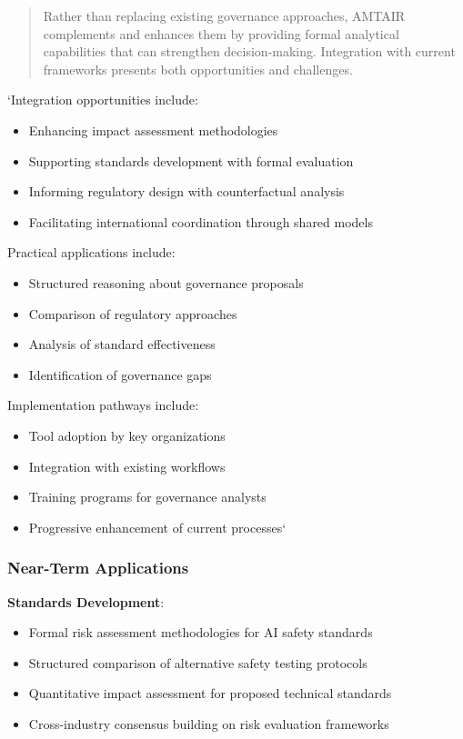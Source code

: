 \documentclass[
  11pt,
  letterpaper,
]{book}
\providecommand{\tightlist}{%
  \setlength{\itemsep}{0pt}\setlength{\parskip}{0pt}}
\begin{document}
\begin{quote}
Rather than replacing existing governance approaches, AMTAIR complements
and enhances them by providing formal analytical capabilities that can
strengthen decision-making. Integration with current frameworks presents
both opportunities and challenges.
\end{quote}

`Integration opportunities include:

\begin{itemize}
\tightlist
\item
  Enhancing impact assessment methodologies
\item
  Supporting standards development with formal evaluation
\item
  Informing regulatory design with counterfactual analysis
\item
  Facilitating international coordination through shared models
\end{itemize}

Practical applications include:

\begin{itemize}
\tightlist
\item
  Structured reasoning about governance proposals
\item
  Comparison of regulatory approaches
\item
  Analysis of standard effectiveness
\item
  Identification of governance gaps
\end{itemize}

Implementation pathways include:

\begin{itemize}
\tightlist
\item
  Tool adoption by key organizations
\item
  Integration with existing workflows
\item
  Training programs for governance analysts
\item
  Progressive enhancement of current processes`
\end{itemize}

\subsubsection{Near-Term Applications}\label{sec-near-term-applications}

\textbf{Standards Development}:

\begin{itemize}
\tightlist
\item
  Formal risk assessment methodologies for AI safety standards
\item
  Structured comparison of alternative safety testing protocols
\item
  Quantitative impact assessment for proposed technical standards
\item
  Cross-industry consensus building on risk evaluation frameworks
\end{itemize}
\end{document}
